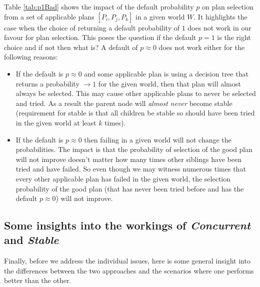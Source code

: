 \documentclass[a4paper]{article}
\newcommand{\cc}{\emph{Concurrent}\xspace}
\newcommand{\st}{\emph{Stable}\xspace}
\newcommand{\dt}{{decision tree}\xspace}
\begin{document}
Table \ref{tab:p1Bad} shows the impact of the default probability $p$ on plan selection from a set of applicable plans $[P_i,P_j,P_k]$ in a given world $W$. It highlights the case when the choice of returning a default probability of $1$ does not work in our favour for plan selection. This poses the question if the default $p=1$ is the right choice and if not then what is? A default of $p\approx0$ does not work either for the following reasons:
\begin{itemize}
\item If the default is $p\approx0$ and some applicable plan is using a \dt that returns a probability $\to 1$ for the given world, then that plan will almost always be selected. This may cause other applicable plans to never be selected and tried. As a result the parent node will \emph{almost never} become stable (requirement for stable is that all children be stable so should have been tried in the given world at least $k$ times).
\item If the default is $p\approx0$ then failing in a given world will not change the probabilities. The impact is that the probability of selection of the good plan will not improve doesn't matter how many times other siblings have been tried and have failed. So even though we may witness numerous times that every other applicable plan has failed in the given world, the selection probability of the good plan (that has never been tried before and has the default $p\approx0$) will not improve.
\end{itemize}


\subsection{Some insights into the workings of \cc and \st}

Finally, before we address the individual issues, here is some general insight into the differences between the two approaches and the scenarios where one performs better than the other.
\end{document}
